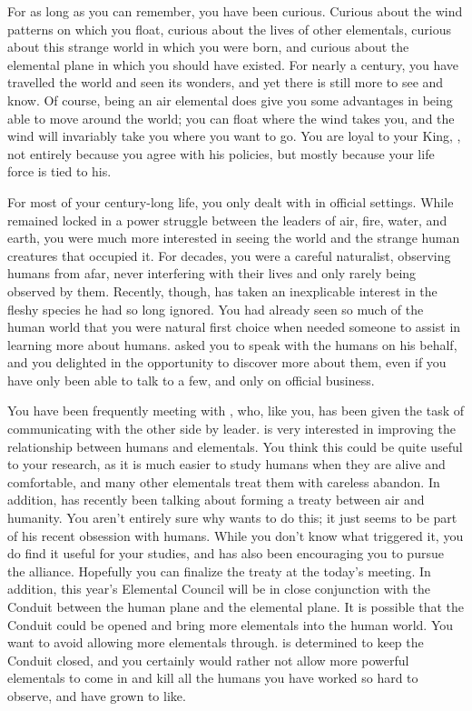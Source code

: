 \documentclass[char]{elementals}
\begin{document}
\name{\cNaturalist{}}

For as long as you can remember, you have been curious.  Curious about the wind patterns on which you float, curious about the lives of other elementals, curious about this strange world in which you were born, and curious about the elemental plane in which you should have existed.  For nearly a century, you have travelled the world and seen its wonders, and yet there is still more to see and know.  Of course, being an air elemental does give you some advantages in being able to move around the world; you can float where the wind takes you, and the wind will invariably take you where you want to go.  You are loyal to your King, \cKing{\intro}, not entirely because you agree with his policies, but mostly because your life force is tied to his.

For most of your century-long life, you only dealt with \cKing{} in official settings.  While \cKing{} remained locked in a power struggle between the leaders of air, fire, water, and earth, you were much more interested in seeing the world and the strange human creatures that occupied it.  For decades, you were a careful naturalist, observing humans from afar, never interfering with their lives and only rarely being observed by them.  Recently, though, \cKing{} has taken an inexplicable interest in the fleshy species he had so long ignored.  You had already seen so much of the human world that you were \cKing{\their} natural first choice when \cKing{\they} needed someone to assist \cKing{\them} in learning more about humans.  \cKing{\They} asked you to speak with the humans on his behalf, and you delighted in the opportunity to discover more about them, even if you have only been able to talk to a few, and only on official business.

You have been frequently meeting with \cDiplomat{\intro}, who, like you, has been given the task of communicating with the other side by \cDiplomat{\their} leader.  \cDiplomat{\They} is very interested in improving the relationship between humans and elementals.  You think this could be quite useful to your research, as it is much easier to study humans when they are alive and comfortable, and many other elementals treat them with careless abandon.  In addition, \cKing{} has recently been talking about forming a treaty between air and humanity.  You aren't entirely sure why \cKing{\they} wants to do this; it just seems to be part of his recent obsession with humans.  While you don't know what triggered it, you do find it useful for your studies, and \cDiplomat{} has also been encouraging you to pursue the alliance.  Hopefully you can finalize the treaty at the today's meeting.  In addition, this year's Elemental Council will be in close conjunction with the Conduit between the human plane and the elemental plane.  It is possible that the Conduit could be opened and bring more elementals into the human world.  You want to avoid allowing more elementals through.  \cKing{} is determined to keep the Conduit closed, and you certainly would rather not allow more powerful elementals to come in and kill all the humans you have worked so hard to observe, and have grown to like.
\end{document}
